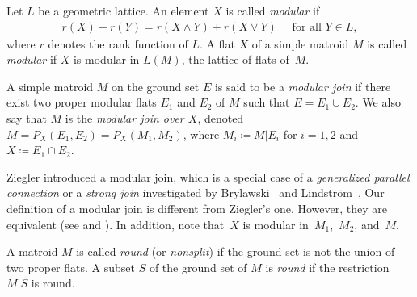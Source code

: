 Let $ L $ be a geometric lattice.
An element $ X $ is called \textit{modular} if
\begin{gather*}
r(X) + r(Y) = r(X \wedge Y) + r(X \vee Y) \quad \text{ for all } Y \in L,
\end{gather*}
where $ r $ denotes the rank function of $ L $.
A flat $ X $ of a simple matroid $ M $ is called \textit{modular} if $ X $ is modular in $ L(M) $, the lattice of flats of~$ M $.

\begin{Definition}
A simple matroid $ M $ on the ground set $ E $ is said to be a \textit{modular join} if there exist two proper modular flats $ E_{1} $ and $ E_{2} $ of $ M $ such that $ E = E_{1} \cup E_{2} $.
We also say that $ M $ is the \textit{modular join over $ X $}, denoted $ M = P_{X}(E_{1}, E_{2}) = P_{X}(M_{1}, M_{2}) $, where $ M_{i} \coloneqq M|E_{i} $ for $ i = 1,2 $ and $ X \coloneqq E_{1} \cap E_{2} $.
\end{Definition}

\begin{Remark}
Ziegler \cite{ziegler1991binary-potams} introduced a modular join, which is a special case of a \textit{generalized parallel connection} or a \textit{strong join} investigated by Brylawski~\cite{brylawski1975modular-totams} and Lindstr{\"o}m~\cite{lindstrom1978strong-joctsa}.
Our definition of a modular join is different from Ziegler's one.
However, they are equivalent (see \cite[Propositioin~3.3]{ziegler1991binary-potams} and \cite[Proposition~5.10]{brylawski1975modular-totams}).
In addition, note that~$ X $ is modular in~$ M_{1}$,~$M_{2} $, and~$ M $.
\end{Remark}

\begin{Definition}A matroid $ M $ is called \textit{round} (or \textit{nonsplit}) if the ground set is not the union of two proper flats. A subset $ S $ of the ground set of $ M $ is \textit{round} if the restriction $ M|S $ is round.
\end{Definition}

